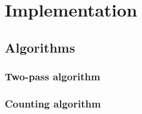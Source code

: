 \chapter{Implementation}

\section{Algorithms}
\subsection{Two-pass algorithm}
\subsection{Counting algorithm}